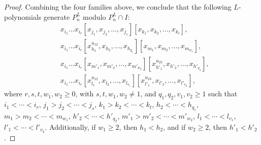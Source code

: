\documentclass[a4paper,reqno]{amsart}
\theoremstyle{definition}
\numberwithin{equation}{section}
\numberwithin{theorem}{section}
\begin{document}
\begin{proof}
Combining the four families above, we conclude that the following $L$-polynomials generate
$P_n^L$ modulo $P_n^L\cap I$:
\begin{equation}\label{No IdUT_3^e_1-e_2}
\begin{split}
&x_{i_1}\dots x_{i_r}[x_{j_1},x_{j_2},\dots,x_{j_s}][x_{k_1},x_{k_2},\dots,x_{k_t}],\\
&x_{i_1}\dots x_{i_r}[x_{h_1}^{u_{12}},x_{h_2},\dots,x_{h_{q_1}}][x_{m_1},x_{m_2},\dots,x_{m_{w_1}}],\\
&x_{i_1}\dots x_{i_r}[x_{m'_1},x_{m'_2},\dots,x_{m'_{w_2}}][x_{h'_1}^{u_{23}},x_{h'_2},\dots,x_{h'_{q_2}}],\\
&x_{i_1}\dots x_{i_r}[x_{l_1}^{u_{12}},x_{l_2},\dots,x_{l_{v_1}}][x_{l'_1}^{u_{23}},x_{l'_2},\dots,x_{l'_{v_2}}],
\end{split}
\end{equation}
where $r,s,t,w_1,w_2\ge0$, with $s,t,w_1,w_2\ne1$, and $q_1,q_2,v_1,v_2\ge1$ such that
$i_1<\cdots<i_r$, $j_1>j_2<\cdots<j_s$, $k_1>k_2<\cdots<k_t$, $h_2<\cdots<h_{q_1}$,
$m_1>m_2<\cdots<m_{w_1}$, $h'_2<\cdots<h'_{q_2}$, $m'_1>m'_2<\cdots<m'_{w_2}$,
$l_1<\cdots<l_{v_1}$, $l'_1<\cdots<l'_{v_2}$. Additionally, if $w_1\ge2$, then $h_1<h_2$, and if
$w_2\ge2$, then $h'_1<h'_2$.



\end{proof}
\end{document}
